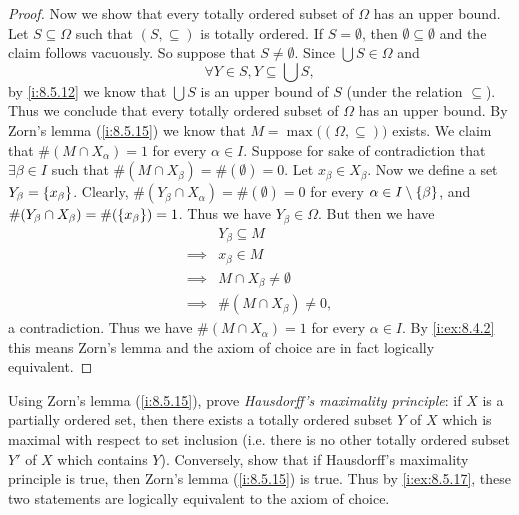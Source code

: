 \begin{proof}
  Now we show that every totally ordered subset of \(\Omega\) has an upper bound.
  Let \(S \subseteq \Omega\) such that \((S, \subseteq)\) is totally ordered.
  If \(S = \emptyset\), then \(\emptyset \subseteq \emptyset\) and the claim follows vacuously.
  So suppose that \(S \neq \emptyset\).
  Since \(\bigcup S \in \Omega\) and
  \[
    \forall Y \in S, Y \subseteq \bigcup S,
  \]
  by \cref{i:8.5.12} we know that \(\bigcup S\) is an upper bound of \(S\) (under the relation \(\subseteq\)).
  Thus we conclude that every totally ordered subset of \(\Omega\) has an upper bound.
  By Zorn's lemma (\cref{i:8.5.15}) we know that \(M = \max\big((\Omega, \subseteq)\big)\) exists.
  We claim that \(\#(M \cap X_{\alpha}) = 1\) for every \(\alpha \in I\).
  Suppose for sake of contradiction that \(\exists \beta \in I\) such that \(\#(M \cap X_{\beta}) = \#(\emptyset) = 0\).
  Let \(x_{\beta} \in X_{\beta}\).
  Now we define a set \(Y_{\beta} = \left\lbrace x_{\beta}\right\rbrace\).
  Clearly, \(\#(Y_{\beta} \cap X_{\alpha}) = \#(\emptyset) = 0\) for every \(\alpha \in I \setminus \left\lbrace\beta\right\rbrace\), and \(\#(Y_{\beta} \cap X_{\beta}) = \#(\left\lbrace x_{\beta}\right\rbrace) = 1\).
  Thus we have \(Y_{\beta} \in \Omega\).
  But then we have
  \begin{align*}
             & Y_{\beta} \subseteq M           \\
    \implies & x_{\beta} \in M                 \\
    \implies & M \cap X_{\beta} \neq \emptyset \\
    \implies & \#(M \cap X_{\beta}) \neq 0,
  \end{align*}
  a contradiction.
  Thus we have \(\#(M \cap X_{\alpha}) = 1\) for every \(\alpha \in I\).
  By \cref{i:ex:8.4.2} this means Zorn's lemma and the axiom of choice are in fact logically equivalent.
\end{proof}

\begin{ex}\label{i:ex:8.5.18}
  Using Zorn's lemma (\cref{i:8.5.15}), prove \emph{Hausdorff's maximality principle}:
  if \(X\) is a partially ordered set, then there exists a totally ordered subset \(Y\) of \(X\) which is maximal with respect to set inclusion
  (i.e. there is no other totally ordered subset \(Y'\) of \(X\) which contains \(Y\)).
  Conversely, show that if Hausdorff's maximality principle is true, then Zorn's lemma (\cref{i:8.5.15}) is true.
  Thus by \cref{i:ex:8.5.17}, these two statements are logically equivalent to the axiom of choice.
\end{ex}

